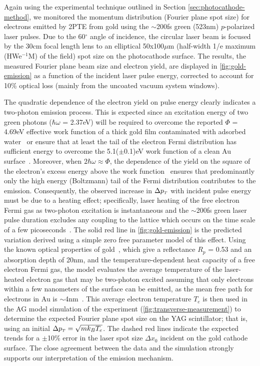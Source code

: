 Again using the experimental technique outlined in Section \ref{sec:photocathode-method}, we monitored the momentum distribution (Fourier plane spot size) for electrons emitted by 2PTE from gold using the $\sim$200fs green (523nm) $p$-polarized laser pulses.
Due to the 60$^{\circ}$ angle of incidence, the circular laser beam is focused by the 30cm focal length lens to an elliptical 50x100$\mu$m (half-width 1/e maximum (HWe$^{-1}$M) of the field) spot size on the photocathode surface.
The results, the measured Fourier plane beam size and electron yield, are displayed in \ref{fig:gold-emission} as a function of the incident laser pulse energy, corrected to account for 10\% optical loss (mainly from the uncoated vacuum system windows).

The quadratic dependence of the electron yield on pulse energy clearly indicates a two-photon emission process.
This is expected since an excitation energy of two green photons ($\hbar \omega$ = 2.37eV) will be required to overcome the reported $\Phi$ = 4.69eV effective work function of a thick gold film contaminated with adsorbed water~\cite{monjushiro_ultraviolet_1991} or ensure that at least the tail of the electron Fermi distribution has sufficient energy to overcome the 5.1($\pm$0.1)eV work function of a clean Au surface~\cite{eastman_photoelectric_1970}.
Moreover, when $2\hbar \omega \approx \Phi$, the dependence of the yield on the square of the electron's excess energy above the work function~\cite{monjushiro_ultraviolet_1991} ensures that predominantly only the high energy (Boltzmann) tail of the Fermi distribution contributes to the emission.
Consequently, the observed increase in $\Delta p_{{\scriptscriptstyle T}}$ with incident pulse energy must be due to a heating effect; specifically, laser heating of the free electron Fermi gas as two-photon excitation is instantaneous and the $\sim$200fs green laser pulse duration excludes any coupling to the lattice which occurs on the time scale of a few picoseconds~\cite{chen_semiclassical_2006}.
The solid red line in \ref{fig:gold-emission} is the predicted variation derived using a simple zero free parameter model of this effect.
Using the known optical properties of gold~\cite{johnson_optical_1972}, which give a reflectance $R_p$ = 0.53 and an absorption depth of 20nm, and the temperature-dependent heat capacity of a free electron Fermi gas, the model evaluates the average temperature of the laser-heated electron gas that may be two-photon excited assuming that only electrons within a few nanometers of the surface can be emitted, as the mean free path for electrons in Au is $\sim$4nm~\cite{seah_quantitative_1979}.
This average electron temperature $T_e$ is then used in the AG model simulation of the experiment (\ref{fig:transverse-measurement}) to determine the expected Fourier plane spot size on the YAG scintillator; that is, using an initial $\Delta p_{{\scriptscriptstyle T}} = \sqrt{m k_B T_e}$.  The dashed red lines indicate the expected trends for a $\pm$10\% error in the laser spot size $\Delta x_0$ incident on the gold cathode surface.
The close agreement between the data and the simulation strongly supports our interpretation of the emission mechanism.
